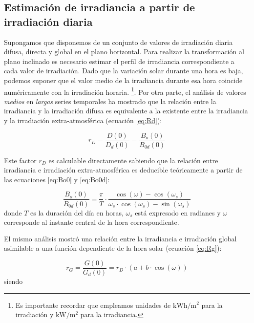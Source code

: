 \subsection{Estimación de irradiancia a partir de irradiación diaria}

Supongamos que disponemos de un conjunto de valores de irradiación diaria
difusa, directa y global en el plano horizontal. Para realizar la
transformación al plano inclinado es necesario estimar el perfil de
irradiancia correspondiente a cada valor de irradiación. Dado que
la variación solar durante una hora es baja, podemos suponer que el
valor medio de la irradiancia durante esa hora coincide numéricamente
con la irradiación horaria.%
\footnote{Es importante recordar que empleamos unidades de $\si{\kWh\per\meter\squared}$
para la irradiación y $\si{\kW\per\meter\squared}$ para la
irradiancia.}. 
Por otra parte, el análisis de valores \emph{medios} en \emph{largas}
series temporales ha mostrado que la relación entre la irradiancia
y la irradiación difusa es equivalente a la existente entre la irradiancia
y la irradiación extra-atmosférica \cite{Collares-Pereira.Rabl1979}
(ecuación \ref{eq:Rd}):

\begin{equation}
r_{D}=\frac{D(0)}{D_{d}(0)}=\frac{B_{o}(0)}{B_{0d}(0)}\label{eq:Rd}\end{equation}

Este factor $r_{D}$ es calculable directamente sabiendo que la relación
entre irradiancia e irradiación extra-atmosférica es deducible teóricamente
a partir de las ecuaciones \ref{eq:Bo0} y \ref{eq:Bo0d}:

\begin{equation}
  \frac{B_{o}(0)}{B_{0d}(0)}=\frac{\pi}{T}\cdot\frac{\cos(\omega)-\cos(\omega_{s})}{\omega_{s}\cdot\cos(\omega_{s})-\sin(\omega_{s})}\label{eq:RelacionExtraAtmosferica}\end{equation}
donde $T$ es la duración del día en horas, $\omega_s$ está expresado en
radianes y $\omega$ corresponde
al instante central de la hora correspondiente.

El mismo análisis mostró una relación entre la irradiancia e irradiación
global asimilable a una función dependiente de la hora solar (ecuación
\ref{eq:Rg}):

\begin{equation}
r_{G}=\frac{G(0)}{G_{d}(0)}=r_{D}\cdot\left(a+b\cdot\cos(\omega)\right)\label{eq:Rg}\end{equation}
siendo

